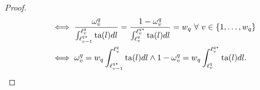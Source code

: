 \documentclass[hidelinks, nonatbib]{elsarticle}
\begin{document}
\begin{lemma}
\begin{proof}
\begin{align}
            &\iff
            \frac{
                \omega_{v}^{q}
            }{
                \int_{
                    \ell_{v-1}^{q*}
                }^{
                    \ell_{v}^{q}
                }{
                    \text{ta}(l)dl
                }
            }
            =
            \frac{
                1 - \omega_{v}^{q}
            }{
                \int_{
                    \ell_{v}^{q}
                }^{
                    \ell_{v}^{q*}
                }{
                    \text{ta}(l)dl
                }
            }
            =
            w_q
            \
            \forall
            \
            v \in \{1, \dots, w_q\}
            \\
            &\iff
            \omega_{v}^{q}
            =
            w_q
            \int_{
                \ell_{v-1}^{q*}
            }^{
                \ell_{v}^{q}
            }{
                \text{ta}(l)
                dl
            }
            \land
            1 - \omega_{v}^{q}
            =
            w_q
            \int_{
                \ell_{v}^{q}
            }^{
                \ell_{v}^{q*}
            }{
                \text{ta}(l)
                dl
            }
            .
        \end{align}

\end{proof}
\end{lemma}
\end{document}
